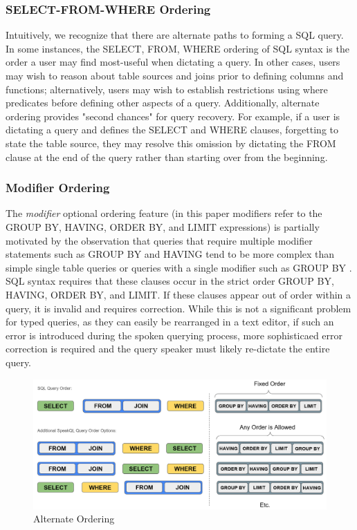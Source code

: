 \subsubsection{\textbf{SELECT-FROM-WHERE Ordering}} 
Intuitively, we recognize that there are alternate paths to forming a SQL query. In some instances, the SELECT, FROM, WHERE ordering of SQL syntax is the order a user may find most-useful when dictating a query. In other cases, users may wish to reason about table sources and joins prior to defining columns and functions; alternatively, users may wish to establish restrictions using where predicates before defining other aspects of a query. Additionally, alternate ordering provides "second chances" for query recovery. For example, if a user is dictating a query and defines the SELECT and WHERE clauses, forgetting to state the table source, they may resolve this omission by dictating the FROM clause at the end of the query rather than starting over from the beginning.

\subsubsection{\textbf{Modifier Ordering}} 
The \emph{modifier}  optional ordering feature (in this paper modifiers refer to the GROUP BY, HAVING, ORDER BY, and LIMIT expressions) is partially motivated by the observation that queries that require multiple modifier statements such as GROUP BY and HAVING tend to be more complex than simple single table queries or queries with a single modifier such as GROUP BY \cite{10.1145/2729094.2742620}. SQL syntax requires that these clauses occur in the strict order GROUP BY, HAVING, ORDER BY, and LIMIT. If these clauses appear out of order within a query, it is invalid and requires correction. While this is not a significant problem for typed queries, as they can easily be rearranged in a text editor, if such an error is introduced during the spoken querying process, more sophisticaed error correction is required and the query speaker must likely re-dictate the entire query.

\begin{figure}
  \centering
  \includegraphics[width=\linewidth]{figures/alternate_ordering.png}
  \caption{Alternate Ordering}
  \label{fig:alternate_ordering}
\end{figure}


